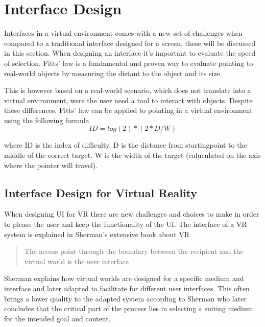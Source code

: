 \section{Interface Design}
Interfaces in a virtual environment comes with a new set of challenges when compared to a traditional interface designed for a screen, these will be discussed in this section.
When designing an interface it's important to evaluate the speed of selection. Fitts' law is a fundamental and proven way to evaluate pointing to real-world objects by measuring the distant to the object and its size\cite{interface:Fitts1954}.

This is however based on a real-world scenario, which does not translate into a virtual environment, were the user need a tool to interact with objects. Despite these differences, Fitts' law can be applied to pointing in a virtual environment using the following formula  \cite{interface:card1978evaluation}
\begin{equation}
ID = log(2) * ( 2 * D / W )
\end{equation}

where ID is the index of difficulty, D is the distance from startingpoint to the middle of the correct target. W is the width of the target (caluculated on the axis where the pointer will travel).

\subsection{Interface Design for Virtual Reality}
When designing UI for VR there are new challenges and choices to make in order to please the user and keep the functionality of the UI. The interface of a VR system is explained in Sherman's extensive book about VR\cite{interface:sherman2002understanding}
 \begin{quote}
   The access point through the boundary between the recipient and the virtual world is the user interface
 \end{quote}
 Sherman explains how virtual worlds are designed for a specific medium and interface and later adapted to facilitate for different user interfaces. This often brings a lower quality to the adapted system according to Sherman who later concludes that the critical part of the process lies in selecting a suiting medium for the intended goal and content\cite{interface:sherman2002understanding}.

